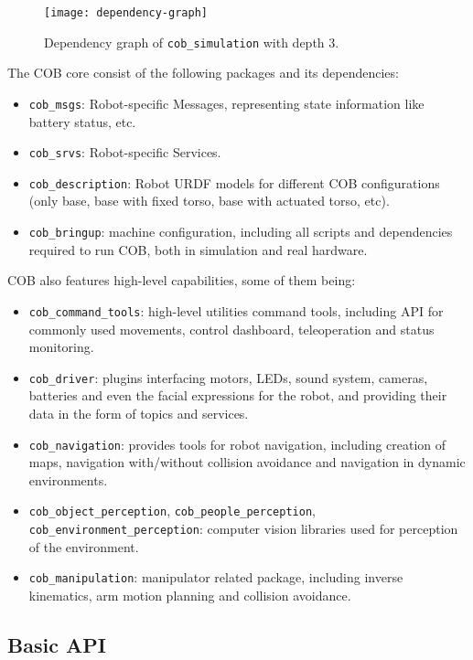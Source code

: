 \begin{figure}[!ht]
\centering
\texttt{[image: dependency-graph]}
\caption{Dependency graph of \texttt{cob\_simulation} with depth 3.}
\label{fig:dependency-graph}
\end{figure}


The COB core consist of the following packages and its dependencies:

\begin{itemize}
\item \texttt{cob\_msgs}: Robot-specific Messages, representing state information like battery status, etc.
\item \texttt{cob\_srvs}: Robot-specific Services.
\item \texttt{cob\_description}: Robot URDF models for different COB configurations (only base, base with fixed torso, base with actuated torso, etc).
\item \texttt{cob\_bringup}: machine configuration, including all scripts and dependencies required to run COB, both in simulation and real hardware.
\end{itemize}

COB also features high-level capabilities, some of them being:

\begin{itemize}
\item \texttt{cob\_command\_tools}: high-level utilities command tools, including API for commonly used movements, control dashboard, teleoperation and status monitoring.
\item \texttt{cob\_driver}: plugins interfacing motors, LEDs, sound system, cameras, batteries and even the facial expressions for the robot, and providing their data in the form of topics and services.
\item \texttt{cob\_navigation}: provides tools for robot navigation, including creation of maps, navigation with/without collision avoidance and navigation in dynamic environments.
\item \texttt{cob\_object\_perception}, \texttt{cob\_people\_perception}, \texttt{cob\_environment\_perception}: computer vision libraries used for perception of the environment.
\item \texttt{cob\_manipulation}: manipulator related package, including inverse kinematics, arm motion planning and collision avoidance.
\end{itemize}

\subsection{Basic API}


